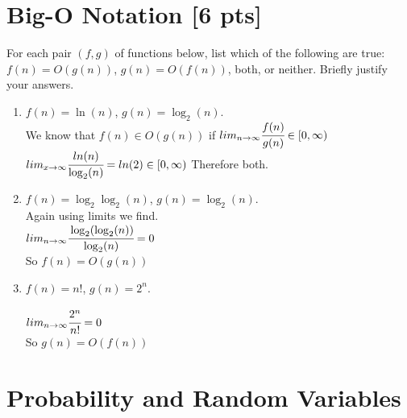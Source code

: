 \documentclass[a4paper]{article}
\theoremstyle{definition}
\newenvironment{soln}{
	\leavevmode\color{blue}\ignorespaces
}{}
\begin{document}
	
	\section{Big-O Notation [6 pts]}
	For each pair $(f, g)$ of functions below, list which of the following
	are true: $f(n) = O(g(n))$, $g(n) = O(f(n))$, both, or
	neither. Briefly justify your answers.
	\begin{enumerate}
		\item 	$f(n) = \ln(n)$, $g(n) = \log_{2}(n)$.\\
		\begin{soln}  We know that $f(n) \in O(g(n))$ if $lim_{n\to\infty} \cfrac{f(n)}{g(n)} \in [0,\infty)$ \\
		$lim_{x\to\infty}\cfrac{ln(n)}{\log_{2}(n)}=ln(2) \in [0,\infty)$
		Therefore both.
		\end{soln}
		
		\item 	$f(n) =  \log_{2}\log_{2}(n)$, $g(n) = \log_{2}(n)$.\\
		\begin{soln} Again using limits we find. \\
		$lim_{n\to\infty}\cfrac{\log_{2}(\log_{2}(n))}{\log_{2}(n)}=0$ \\
		So $f(n) = O(g(n))$
		\end{soln}
		
		\item 	$f(n) = n!$, $g(n) = 2^n$.\\
		\begin{soln}
		$lim_{n\to\infty}\cfrac{2^{n}}{n!}=0$ \\
		So $g(n) = O(f(n))$
		\end{soln}
	\end{enumerate}
	
	
	
	
	
	\section{Probability and Random Variables }
\end{document}

